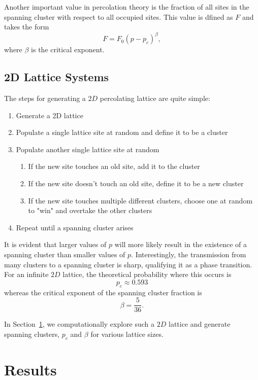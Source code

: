 \documentclass[12pt]{article}
\begin{document}
Another important value in percolation theory is the fraction of all sites in the spanning cluster with respect to all occupied sites. This value is dfined as $F$ and takes the form
\begin{equation}
  \label{eq:spanningfraction}
  F = F_0 \left(p - p_c\right)^\beta,
\end{equation}
where $\beta$ is the critical exponent.

\subsection{2D Lattice Systems}
\label{sec:lattice}

The steps for generating a $2D$ percolating lattice are quite simple:
\begin{enumerate}
  \label{code:percolatinglattice}
  \item Generate a 2D lattice
  \item Populate a single lattice site at random and define it to be a cluster
  \item Populate another single lattice site at random
  \begin{enumerate}
    \item If the new site touches an old site, add it to the cluster
    \item If the new site doesn't touch an old site, define it to be a new cluster
    \item If the new site touches multiple different clusters, choose one at random to "win" and overtake the other clusters
  \end{enumerate}
  \item Repeat until a spanning cluster arises
\end{enumerate}

It is evident that larger values of $p$ will more likely result in the existence of a spanning cluster than smaller values of $p$. Interestingly, the transmission from many clusters to a spanning cluster is sharp, qualifying it as a phase transition. For an infinite $2D$ lattice, the theoretical probability where this occurs is
\begin{equation}
  \label{eq:theoreticalpc}
  p_c \approx 0.593
\end{equation}
whereas the critical exponent of the spanning cluster fraction is
\begin{equation}
  \label{eq:theoreticalbeta}
  \beta = \frac{5}{36}.
\end{equation}

In Section~\ref{sec:results}, we computationally explore such a $2D$ lattice and generate spanning clusters, $p_c$ and $\beta$ for various lattice sizes.

\section{Results}
\label{sec:results}
\end{document}
